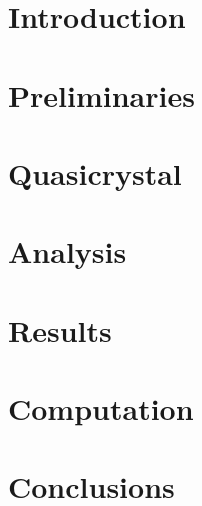 \documentclass[a4paper,10pt,twoside]{report}
\theoremstyle{remark}
\begin{document}
\clearpage
\thispagestyle{empty}
\cleardoublepage
\thispagestyle{empty}

\tableofcontents


\chapter*{Introduction}


\chapter{Preliminaries}

%
\clearpage
\chapter{Quasicrystal}


\clearpage
\chapter{Analysis}

\pagebreak


\clearpage
\chapter{Results}\label{cha_results}

\clearpage

\clearpage


\clearpage
\chapter{Computation}\label{cha_computation}


\chapter*{Conclusions}



\end{document}
